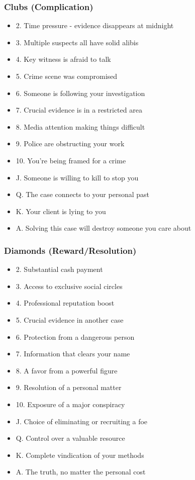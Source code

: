 \documentclass[11pt]{article}
\begin{document}
\subsubsection{Clubs (Complication)}
\begin{itemize}
    \item 2. Time pressure - evidence disappears at midnight
    \item 3. Multiple suspects all have solid alibis
    \item 4. Key witness is afraid to talk
    \item 5. Crime scene was compromised
    \item 6. Someone is following your investigation
    \item 7. Crucial evidence is in a restricted area
    \item 8. Media attention making things difficult
    \item 9. Police are obstructing your work
    \item 10. You're being framed for a crime
    \item J. Someone is willing to kill to stop you
    \item Q. The case connects to your personal past
    \item K. Your client is lying to you
    \item A. Solving this case will destroy someone you care about
\end{itemize}

\subsubsection{Diamonds (Reward/Resolution)}
\begin{itemize}
    \item 2. Substantial cash payment
    \item 3. Access to exclusive social circles
    \item 4. Professional reputation boost
    \item 5. Crucial evidence in another case
    \item 6. Protection from a dangerous person
    \item 7. Information that clears your name
    \item 8. A favor from a powerful figure
    \item 9. Resolution of a personal matter
    \item 10. Exposure of a major conspiracy
    \item J. Choice of eliminating or recruiting a foe
    \item Q. Control over a valuable resource
    \item K. Complete vindication of your methods
    \item A. The truth, no matter the personal cost
\end{itemize}
\end{document}
